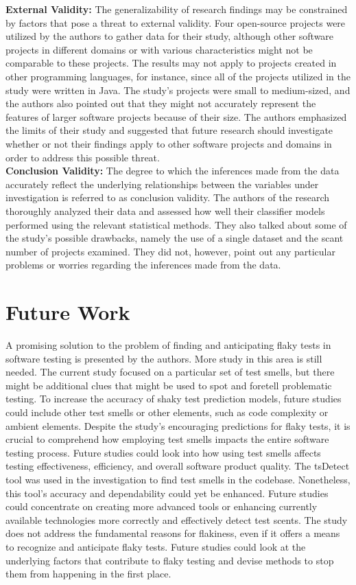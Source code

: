 \documentclass[sigconf,review]{acmart}
\begin{document}
 \textbf{External Validity:}
 The generalizability of research findings may be constrained by factors that pose a threat to external validity. Four open-source projects were utilized by the authors to gather data for their study, although other software projects in different domains or with various characteristics might not be comparable to these projects. The results may not apply to projects created in other programming languages, for instance, since all of the projects utilized in the study were written in Java. The study's projects were small to medium-sized, and the authors also pointed out that they might not accurately represent the features of larger software projects because of their size. The authors emphasized the limits of their study and suggested that future research should investigate whether or not their findings apply to other software projects and domains in order to address this possible threat.
\\

\textbf{Conclusion Validity:}
The degree to which the inferences made from the data accurately reflect the underlying relationships between the variables under investigation is referred to as conclusion validity.
The authors of the research thoroughly analyzed their data and assessed how well their classifier models performed using the relevant statistical methods. They also talked about some of the study's possible drawbacks, namely the use of a single dataset and the scant number of projects examined. They did not, however, point out any particular problems or worries regarding the inferences made from the data.




 \section{Future Work}
 \label{Section:FutureWork}
 A promising solution to the problem of finding and anticipating flaky tests in software testing is presented by the authors. More study in this area is still needed. The current study focused on a particular set of test smells, but there might be additional clues that might be used to spot and foretell problematic testing. To increase the accuracy of shaky test prediction models, future studies could include other test smells or other elements, such as code complexity or ambient elements. Despite the study's encouraging predictions for flaky tests, it is crucial to comprehend how employing test smells impacts the entire software testing process. Future studies could look into how using test smells affects testing effectiveness, efficiency, and overall software product quality. The tsDetect tool was used in the investigation to find test smells in the codebase. Nonetheless, this tool's accuracy and dependability could yet be enhanced. Future studies could concentrate on creating more advanced tools or enhancing currently available technologies more correctly and effectively detect test scents. The study does not address the fundamental reasons for flakiness, even if it offers a means to recognize and anticipate flaky tests. Future studies could look at the underlying factors that contribute to flaky testing and devise methods to stop them from happening in the first place.
\end{document}
